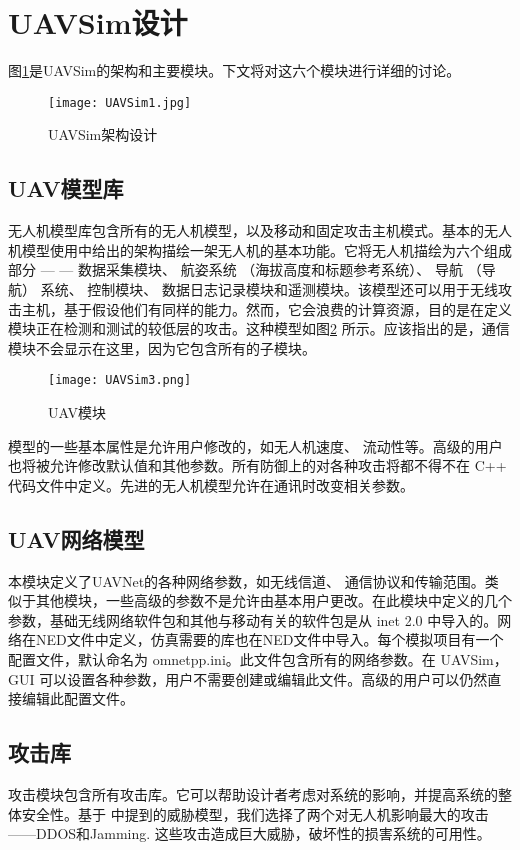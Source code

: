 \documentclass[bachelor,fontset=fandol,AutoFakeBold=true]{nuaathesis}
\begin{document}
    \section{UAVSim设计}
    图\ref{fig2}是UAVSim的架构和主要模块。下文将对这六个模块进行详细的讨论。
    \begin{figure}[]
	    \centering          	
        \texttt{[image: UAVSim1.jpg]}  
        \caption{UAVSim架构设计} \label{fig2}
    \end{figure} 
        \subsection{UAV模型库}
        无人机模型库包含所有的无人机模型，以及移动和固定攻击主机模式。基本的无人机模型使用\citep{6javaid2012cyber}\cite{6javaid2012cyber}中给出的架构描绘一架无人机的基本功能。它将无人机描绘为六个组成部分 — — 数据采集模块、 航姿系统 （海拔高度和标题参考系统）、 导航 （导航） 系统、 控制模块、 数据日志记录模块和遥测模块。该模型还可以用于无线攻击主机，基于假设他们有同样的能力。然而，它会浪费的计算资源，目的是在定义模块正在检测和测试的较低层的攻击。这种模型如图\ref{fig3} 所示。应该指出的是，通信模块不会显示在这里，因为它包含所有的子模块。
        \begin{figure}[]
	        \centering          	
            \texttt{[image: UAVSim3.png]}  
            \caption{UAV模块} \label{fig3}
        \end{figure} 
        模型的一些基本属性是允许用户修改的，如无人机速度、 流动性等。高级的用户也将被允许修改默认值和其他参数。所有防御上的对各种攻击将都不得不在 C++ 代码文件中定义。先进的无人机模型允许在通讯时改变相关参数。
        
        \subsection{UAV网络模型}
        本模块定义了UAVNet的各种网络参数，如无线信道、 通信协议和传输范围。类似于其他模块，一些高级的参数不是允许由基本用户更改。在此模块中定义的几个参数，基础无线网络软件包和其他与移动有关的软件包是从 inet 2.0 中导入的。网络在NED文件中定义，仿真需要的库也在NED文件中导入。每个模拟项目有一个配置文件，默认命名为 omnetpp.ini。此文件包含所有的网络参数。在 UAVSim，GUI 可以设置各种参数，用户不需要创建或编辑此文件。高级的用户可以仍然直接编辑此配置文件。
        
        \subsection{攻击库}
        攻击模块包含所有攻击库。它可以帮助设计者考虑对系统的影响，并提高系统的整体安全性。基于 \citep{6javaid2012cyber}\cite{6javaid2012cyber} 中提到的威胁模型，我们选择了两个对无人机影响最大的攻击——DDOS和Jamming. 这些攻击造成巨大威胁，破坏性的损害系统的可用性。
\end{document}
